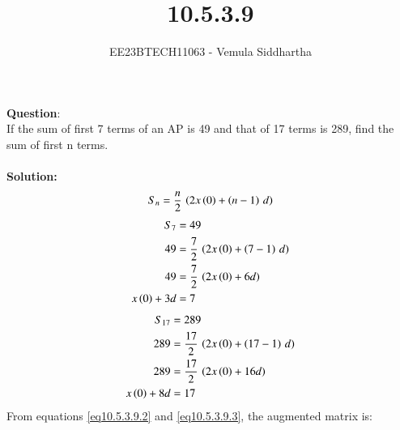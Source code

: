 \documentclass[journal,12pt,twocolumn]{IEEEtran}
\theoremstyle{remark}
\begin{document}

\vspace{3cm}

\title{10.5.3.9}
\author{EE23BTECH11063 - Vemula Siddhartha
}
\maketitle
\newpage
\bigskip

\renewcommand{\thefigure}{\theenumi}
\renewcommand{\thetable}{\theenumi}
\textbf{Question}:\\
If the sum of first 7 terms of an AP is 49 and that of 17 terms is 289, find the sum of
first n terms.
\\\\
\textbf{Solution: }\\
\begin{align}
S_n=\frac{n}{2}\,\left(2x\left(0\right)+\left(n-1\right)\,d\right)\label{eq10.5.3.9.1}
\end{align}
\begin{align}
S_7&=49 \\
49&=\frac{7}{2}\,\left(2x\left(0\right)+\left(7-1\right)\,d\right)  \\
49&=\frac{7}{2}\,\left(2x\left(0\right)+6d\right)  \\
x\left(0\right)+3d&=7\label{eq10.5.3.9.2}
\end{align}
\begin{align}
S_{17}&=289  \\
289&=\frac{17}{2}\,\left(2x\left(0\right)+\left(17-1\right)\,d\right)  \\
289&=\frac{17}{2}\,\left(2x\left(0\right)+16d\right)  \\
x\left(0\right)+8d&=17 \label{eq10.5.3.9.3}
\end{align}
From  equations \ref{eq10.5.3.9.2} and \ref{eq10.5.3.9.3}, the augmented matrix is:
\end{document}
